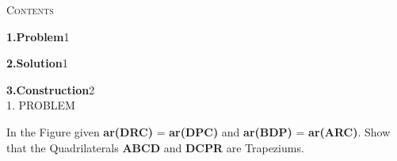 \documentclass[a4paper,10pt]{report}
\begin{document}
\begin{multicols}{2}
\centering \large\textsc{C}\footnotesize\textsc{ontents}\vspace{5mm}
\\
\raggedright\large\textbf{1.\hspace{1cm}Problem}\hspace{3cm}1\vspace{5mm}\\
\raggedright\large\textbf{2.\hspace{1cm}Solution}\hspace{3.1cm}1\vspace{5mm}\\
\raggedright\large\textbf{3.\hspace{1cm}Construction}\hspace{1.9cm}2\vspace{5mm}\\


\centering \large\textsc{1.  P}\footnotesize\textsc{ROBLEM}\vspace{5mm}\\
	\raggedright\large In the Figure given \textbf{ar(DRC)} = \textbf{ar(DPC)} and \textbf{ar(BDP)} = \textbf{ar(ARC)}. Show that the Quadrilaterals \textbf{ABCD} and \textbf{DCPR} are Trapeziums.\\ \vspace{3mm}


\end{multicols}
\end{document}
